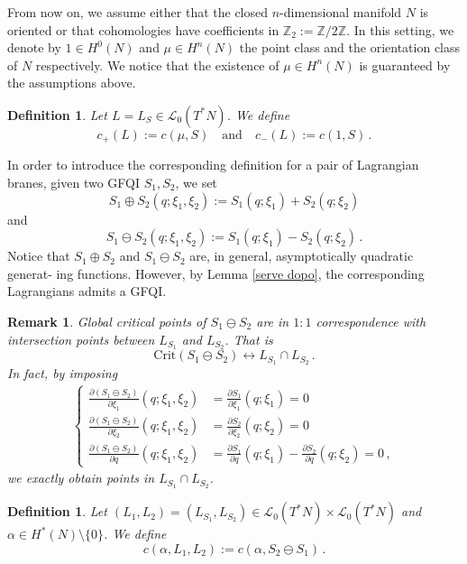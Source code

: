 \documentclass{article}
\newcommand{\1}{\mathbbm{1}}
\newcommand{\numberset}{\mathbb}
\newcommand{\Z}{\numberset{Z}}
\newtheorem{defn}[thm]{Definition}
\newtheorem{rem}[thm]{Remark}
\theoremstyle{remark}
\begin{document}
{{\indent From now on, we assume either that the closed $n$-dimensional manifold $N$ is oriented or that cohomologies have coefficients in $\Z_2:=\Z/2\Z$. In this setting, we denote by $1 \in H^0(N)$ and $\mu \in H^n(N)$ the point class and the orientation class of $N$ respectively. We notice that the existence of $\mu \in H^n(N)$ is guaranteed by the assumptions above. 

\begin{defn} Let $L = L_{S} \in\mathscr{L}_0(T^*N)$. We define
\begin{equation*}
c_+(L) :=c (\mu, S) \quad \text{and} \quad c_-(L):=c(1, S)\, .
\end{equation*}
\end{defn}

\noindent In order to introduce the corresponding definition for a pair of Lagrangian branes, given two GFQI $S_1, S_2$, we set
$$S_1 \oplus S_2(q; \xi_1, \xi_2) := S_1(q; \xi_1) + S_2(q; \xi_2)$$
and 
$$S_1\ominus S_2(q; \xi_1, \xi_2) := S_1(q; \xi_1) - S_2(q; \xi_2)\, .$$
Notice that $S_1 \oplus S_2$ and $S_1 \ominus S_2$ are, in general, asymptotically quadratic generat-
ing functions. However, by Lemma \ref{serve dopo}, the corresponding Lagrangians admits a GFQI.
\begin{rem} \label{S1 - S2} \textnormal{Global critical points of $S_1\ominus S_2$ are in $1:1$ correspondence with intersection points between $L_{S_1}$ and $L_{S_2}$. That is
$$\text{Crit}(S_1\ominus S_2) \leftrightarrow L_{S_1} \cap L_{S_2}\, .$$
In fact, by imposing
\begin{eqnarray*} 
\begin{cases}
\frac{\partial (S_1\ominus S_2)}{\partial \xi_1}(q;\xi_1,\xi_2) & = \frac{\partial S_1}{\partial \xi_1}(q;\xi_1) = 0  \\
\frac{\partial (S_1\ominus S_2)}{\partial \xi_2}(q;\xi_1,\xi_2) & = \frac{\partial S_2}{\partial \xi_2}(q;\xi_2) = 0  \\
\frac{\partial (S_1\ominus S_2)}{\partial q}(q;\xi_1,\xi_2) & = \frac{\partial S_1}{\partial q}(q;\xi_1) - \frac{\partial S_2}{\partial q}(q;\xi_2) = 0\, ,
\end{cases}
\end{eqnarray*}
we exactly obtain 
points in $L_{S_1} \cap L_{S_2}$.}
\end{rem}
\begin{defn} \label{serve in ultima}
Let $(L_1,L_2) = (L_{S_1},L_{S_2}) \in \mathscr{L}_0(T^*N) \times \mathscr{L}_0(T^*N)$ and $\alpha\in H^*(N) \setminus \{0\}$. We define
$$c(\alpha, L_1,L_2) := c(\alpha, S_2 \ominus S_1)\, .$$   

\end{defn}}}
\end{document}
